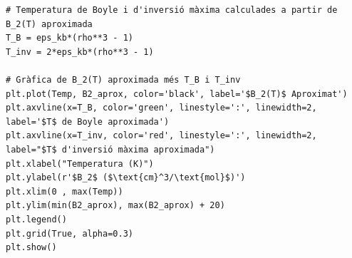 \documentclass[a4paper, 10pt]{article}
\begin{document}
\begin{lstlisting}[caption={Codi pels gràfics trobats a l'apartat d.}]
# Temperatura de Boyle i d'inversió màxima calculades a partir de B_2(T) aproximada
T_B = eps_kb*(rho**3 - 1)
T_inv = 2*eps_kb*(rho**3 - 1)

# Gràfica de B_2(T) aproximada més T_B i T_inv
plt.plot(Temp, B2_aprox, color='black', label='$B_2(T)$ Aproximat')
plt.axvline(x=T_B, color='green', linestyle=':', linewidth=2, label='$T$ de Boyle aproximada')
plt.axvline(x=T_inv, color='red', linestyle=':', linewidth=2, label="$T$ d'inversió màxima aproximada")
plt.xlabel("Temperatura (K)")
plt.ylabel(r'$B_2$ ($\text{cm}^3/\text{mol}$)')
plt.xlim(0 , max(Temp))
plt.ylim(min(B2_aprox), max(B2_aprox) + 20)
plt.legend()
plt.grid(True, alpha=0.3)
plt.show()

\end{lstlisting}
\end{document}

